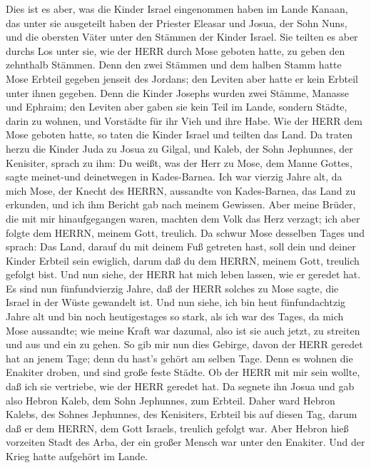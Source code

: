  Dies ist es aber, was die Kinder Israel eingenommen haben
im Lande Kanaan, das unter sie ausgeteilt haben der Priester Eleasar und
Josua, der Sohn Nuns, und die obersten Väter unter den Stämmen der
Kinder Israel.  Sie teilten es aber durchs Los unter sie,
wie der HERR durch Mose geboten hatte, zu geben den zehnthalb Stämmen.
 Denn den zwei Stämmen und dem halben Stamm hatte Mose
Erbteil gegeben jenseit des Jordans; den Leviten aber hatte er kein
Erbteil unter ihnen gegeben.  Denn die Kinder Josephs wurden
zwei Stämme, Manasse und Ephraim; den Leviten aber gaben sie kein Teil
im Lande, sondern Städte, darin zu wohnen, und Vorstädte für ihr Vieh
und ihre Habe.  Wie der HERR dem Mose geboten hatte, so
taten die Kinder Israel und teilten das Land.  Da traten
herzu die Kinder Juda zu Josua zu Gilgal, und Kaleb, der Sohn Jephunnes,
der Kenisiter, sprach zu ihm: Du weißt, was der Herr zu Mose, dem Manne
Gottes, sagte meinet-und deinetwegen in Kades-Barnea.  Ich
war vierzig Jahre alt, da mich Mose, der Knecht des HERRN, aussandte von
Kades-Barnea, das Land zu erkunden, und ich ihm Bericht gab nach meinem
Gewissen.  Aber meine Brüder, die mit mir hinaufgegangen
waren, machten dem Volk das Herz verzagt; ich aber folgte dem HERRN,
meinem Gott, treulich.  Da schwur Mose desselben Tages und
sprach: Das Land, darauf du mit deinem Fuß getreten hast, soll dein und
deiner Kinder Erbteil sein ewiglich, darum daß du dem HERRN, meinem
Gott, treulich gefolgt bist.  Und nun siehe, der HERR hat
mich leben lassen, wie er geredet hat. Es sind nun fünfundvierzig Jahre,
daß der HERR solches zu Mose sagte, die Israel in der Wüste gewandelt
ist. Und nun siehe, ich bin heut fünfundachtzig Jahre alt 
und bin noch heutigestages so stark, als ich war des Tages, da mich Mose
aussandte; wie meine Kraft war dazumal, also ist sie auch jetzt, zu
streiten und aus und ein zu gehen.  So gib mir nun dies
Gebirge, davon der HERR geredet hat an jenem Tage; denn du hast's gehört
am selben Tage. Denn es wohnen die Enakiter droben, und sind große feste
Städte. Ob der HERR mit mir sein wollte, daß ich sie vertriebe, wie der
HERR geredet hat.  Da segnete ihn Josua und gab also Hebron
Kaleb, dem Sohn Jephunnes, zum Erbteil.  Daher ward Hebron
Kalebs, des Sohnes Jephunnes, des Kenisiters, Erbteil bis auf diesen
Tag, darum daß er dem HERRN, dem Gott Israels, treulich gefolgt war.
 Aber Hebron hieß vorzeiten Stadt des Arba, der ein großer
Mensch war unter den Enakiter. Und der Krieg hatte aufgehört im Lande.

